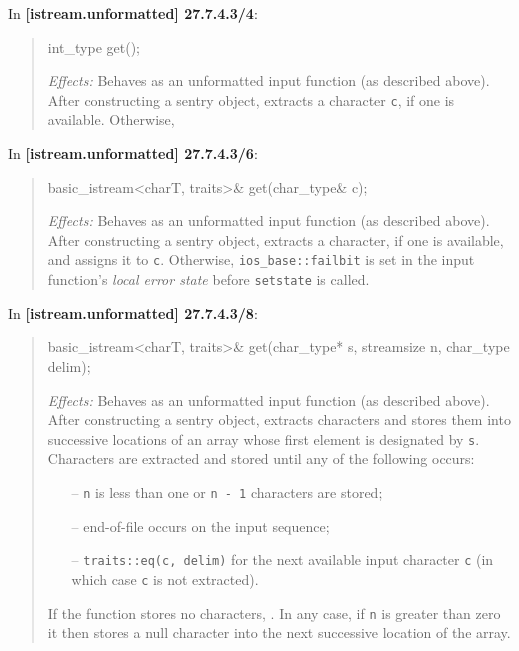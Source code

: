\documentclass{wg21}
\begin{document}
In \textbf{[istream.unformatted] 27.7.4.3/4}:
\begin{quote}
\begin{codeblock}
int_type get();
\end{codeblock}
\textit{Effects:} Behaves as an unformatted input function (as described above).
After constructing a sentry object, extracts a character \texttt{c}, if one is
available. Otherwise, 
\end{quote}

In \textbf{[istream.unformatted] 27.7.4.3/6}:
\begin{quote}
\begin{codeblock}
basic_istream<charT, traits>& get(char_type& c);
\end{codeblock}
\textit{Effects:} Behaves as an unformatted input function (as described above).
After constructing a sentry object, extracts a character, if one is available,
and assigns it to \texttt{c}. Otherwise, 
{\texttt{ios_base::failbit} is set in the input function's \textit{local error state}
before \texttt{setstate} is called}.
\end{quote}

In \textbf{[istream.unformatted] 27.7.4.3/8}:
\begin{quote}
\begin{codeblock}
basic_istream<charT, traits>& get(char_type* s, streamsize n, char_type delim);
\end{codeblock}
\textit{Effects:} Behaves as an unformatted input function (as described above).
After constructing a sentry object, extracts characters and stores them into
successive locations of an array whose first element is designated by \texttt{s}.
Characters are extracted and stored until any of the following occurs:
\begin{itemize}
  \item[--] \texttt{n} is less than one or \texttt{n - 1} characters are stored;
  \item[--] end-of-file occurs on the input sequence;
  \item[--] \texttt{traits::eq(c, delim)} for the next available input character
            \texttt{c} (in which case \texttt{c} is not extracted).
\end{itemize}
If the function stores no characters, .
In any case, if \texttt{n} is greater than zero it then stores a
null character into the next successive location of the array.
\end{quote}
\end{document}
